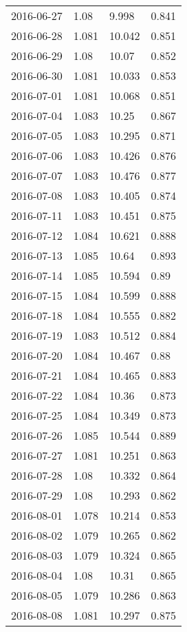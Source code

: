 \begin{center}
\begin{longtable}{r lll}
    2016-06-27 & 1.08   & 9.998  & 0.841  \\
    2016-06-28 & 1.081  & 10.042 & 0.851  \\
    2016-06-29 & 1.08   & 10.07  & 0.852  \\
    2016-06-30 & 1.081  & 10.033 & 0.853  \\
    2016-07-01 & 1.081  & 10.068 & 0.851  \\
    2016-07-04 & 1.083  & 10.25  & 0.867  \\
    2016-07-05 & 1.083  & 10.295 & 0.871  \\
    2016-07-06 & 1.083  & 10.426 & 0.876  \\
    2016-07-07 & 1.083  & 10.476 & 0.877  \\
    2016-07-08 & 1.083  & 10.405 & 0.874  \\
    2016-07-11 & 1.083  & 10.451 & 0.875  \\
    2016-07-12 & 1.084  & 10.621 & 0.888  \\
    2016-07-13 & 1.085  & 10.64  & 0.893  \\
    2016-07-14 & 1.085  & 10.594 & 0.89   \\
    2016-07-15 & 1.084  & 10.599 & 0.888  \\
    2016-07-18 & 1.084  & 10.555 & 0.882  \\
    2016-07-19 & 1.083  & 10.512 & 0.884  \\
    2016-07-20 & 1.084  & 10.467 & 0.88   \\
    2016-07-21 & 1.084  & 10.465 & 0.883  \\
    2016-07-22 & 1.084  & 10.36  & 0.873  \\
    2016-07-25 & 1.084  & 10.349 & 0.873  \\
    2016-07-26 & 1.085  & 10.544 & 0.889  \\
    2016-07-27 & 1.081  & 10.251 & 0.863  \\
    2016-07-28 & 1.08   & 10.332 & 0.864  \\
    2016-07-29 & 1.08   & 10.293 & 0.862  \\
    2016-08-01 & 1.078  & 10.214 & 0.853  \\
    2016-08-02 & 1.079  & 10.265 & 0.862  \\
    2016-08-03 & 1.079  & 10.324 & 0.865  \\
    2016-08-04 & 1.08   & 10.31  & 0.865  \\
    2016-08-05 & 1.079  & 10.286 & 0.863  \\
    2016-08-08 & 1.081  & 10.297 & 0.875  \\

\end{longtable}
\end{center}
